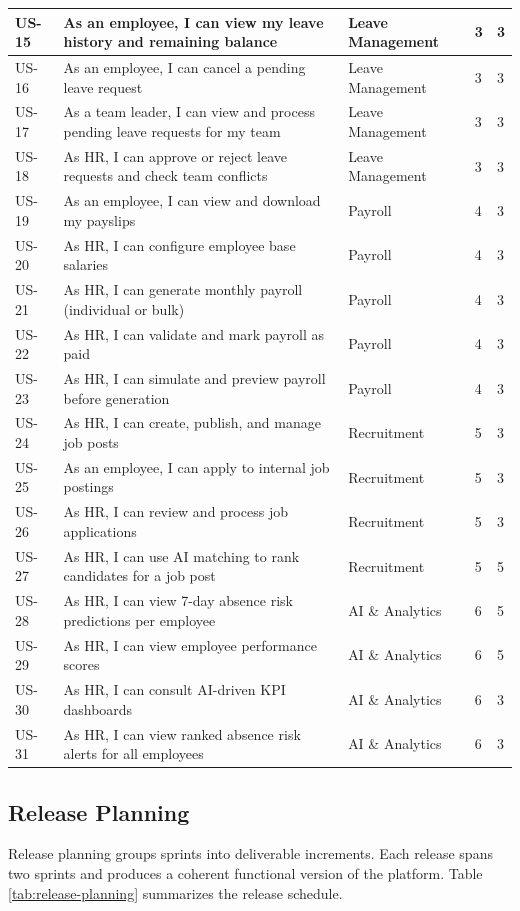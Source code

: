 \begin{longtable}[c]{
    |p{}
    |p{}
    |p{}
    |p{}
    |p{}|
}
    \hline
    US-15 & As an employee, I can view my leave history and remaining balance & Leave Management & 3 & 3 \\
    \hline
    US-16 & As an employee, I can cancel a pending leave request & Leave Management & 3 & 3 \\
    \hline
    US-17 & As a team leader, I can view and process pending leave requests for my team & Leave Management & 3 & 3 \\
    \hline
    US-18 & As HR, I can approve or reject leave requests and check team conflicts & Leave Management & 3 & 3 \\
    \hline
    US-19 & As an employee, I can view and download my payslips & Payroll & 4 & 3 \\
    \hline
    US-20 & As HR, I can configure employee base salaries & Payroll & 4 & 3 \\
    \hline
    US-21 & As HR, I can generate monthly payroll (individual or bulk) & Payroll & 4 & 3 \\
    \hline
    US-22 & As HR, I can validate and mark payroll as paid & Payroll & 4 & 3 \\
    \hline
    US-23 & As HR, I can simulate and preview payroll before generation & Payroll & 4 & 3 \\
    \hline
    US-24 & As HR, I can create, publish, and manage job posts & Recruitment & 5 & 3 \\
    \hline
    US-25 & As an employee, I can apply to internal job postings & Recruitment & 5 & 3 \\
    \hline
    US-26 & As HR, I can review and process job applications & Recruitment & 5 & 3 \\
    \hline
    US-27 & As HR, I can use AI matching to rank candidates for a job post & Recruitment & 5 & 5 \\
    \hline
    US-28 & As HR, I can view 7-day absence risk predictions per employee & AI \& Analytics & 6 & 5 \\
    \hline
    US-29 & As HR, I can view employee performance scores & AI \& Analytics & 6 & 5 \\
    \hline
    US-30 & As HR, I can consult AI-driven KPI dashboards & AI \& Analytics & 6 & 3 \\
    \hline
    US-31 & As HR, I can view ranked absence risk alerts for all employees & AI \& Analytics & 6 & 3 \\
    \hline
\end{longtable}

\subsection{Release Planning}
Release planning groups sprints into deliverable increments. Each release spans two sprints and produces a coherent functional version of the platform. Table \ref{tab:release-planning} summarizes the release schedule.

